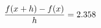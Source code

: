 \documentclass[preview]{standalone}
\begin{document}
\begin{align*}
\special{dvisvgm:raw <g id='unique000'>}\frac{f(x+h)-f(x)}{h} = 2.358\special{dvisvgm:raw </g>}
\end{align*}
\end{document}
